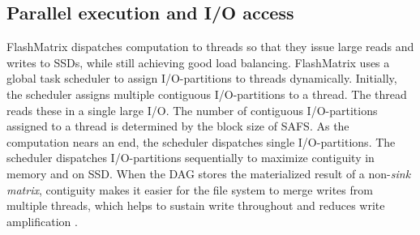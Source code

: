 \subsection{Parallel execution and I/O access}
\vspace{-4pt}
FlashMatrix dispatches computation to threads so that they
issue large reads and writes to SSDs, while still achieving good load balancing.
FlashMatrix uses a global task scheduler to assign I/O-partitions to threads
dynamically. Initially, the scheduler assigns multiple contiguous I/O-partitions
to a thread. The thread reads these in a single large I/O.
The number of contiguous I/O-partitions assigned to a thread is determined by
the block size of SAFS.
As the computation nears an end, the scheduler dispatches single I/O-partitions. 
The scheduler dispatches I/O-partitions sequentially to maximize contiguity in memory
and on SSD.
When the DAG stores the materialized result of a non-\textit{sink matrix}, 
contiguity makes it easier for the file system to merge
writes from multiple threads, which helps to sustain write throughout and reduces
write amplification \cite{ripq}.

